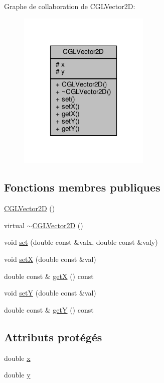 Graphe de collaboration de C\-G\-L\-Vector2\-D\-:
\nopagebreak
\begin{figure}[H]
\begin{center}
\leavevmode
\includegraphics[width=178pt]{db/d79/class_c_g_l_vector2_d__coll__graph}
\end{center}
\end{figure}
\subsection*{Fonctions membres publiques}
\begin{DoxyCompactItemize}
\item 
\hyperlink{class_c_g_l_vector2_d_a777d33ddc05a95c0c4a56672d50a3138}{C\-G\-L\-Vector2\-D} ()
\item 
virtual \hyperlink{class_c_g_l_vector2_d_a93cf12a834078803bee4f19d42e09a02}{$\sim$\-C\-G\-L\-Vector2\-D} ()
\item 
void \hyperlink{class_c_g_l_vector2_d_a37b79a5ca7b3445df956e177f7c436fc}{set} (double const \&valx, double const \&valy)
\item 
void \hyperlink{class_c_g_l_vector2_d_a22db1a511fae81b0d7a6766b6490dd8c}{set\-X} (double const \&val)
\item 
double const \& \hyperlink{class_c_g_l_vector2_d_a5f25e872259c579251336dfe0faf8701}{get\-X} () const 
\item 
void \hyperlink{class_c_g_l_vector2_d_a4c89a21e28a86848c6b023ad60baef4c}{set\-Y} (double const \&val)
\item 
double const \& \hyperlink{class_c_g_l_vector2_d_ad279638b74a0caac60632b169136688c}{get\-Y} () const 
\end{DoxyCompactItemize}
\subsection*{Attributs protégés}
\begin{DoxyCompactItemize}
\item 
double \hyperlink{class_c_g_l_vector2_d_adca68a6660d264b4fcb312c881c57861}{x}
\item 
double \hyperlink{class_c_g_l_vector2_d_a36a88cf9827f308a125e51164c73e21f}{y}
\end{DoxyCompactItemize}


